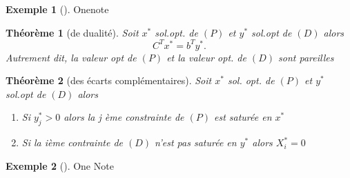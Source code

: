 \documentclass{article}
\theoremstyle{plain}%
\newtheorem{thm}{Théorème}[section]
\theoremstyle{definition}
\newtheorem{exmp}{Exemple}[section]
\theoremstyle{remark}
\begin{document}
\begin{exmp}[]
    Onenote
\end{exmp}

\begin{thm}[de dualité]
    Soit $ x^* $ sol.opt. de $ (P) $ et $ y^* $ sol.opt de $ (D) $ alors 
    \[
        C^T x^* = b^T y^*
    .\]
    Autrement dit, la valeur opt de $ (P) $ et la valeur opt. de $ (D) $ sont pareilles
\end{thm}

\begin{thm}[des écarts complémentaires]
    Soit $ x^* $ sol. opt. de $ (P) $ et $ y^* $ sol.opt de $ (D) $ alors \begin{enumerate}
        \item Si $ y_j^* >0 $ alors la j ème constrainte de $ (P) $ est saturée en $ x^* $ 
        \item Si la ième contrainte de $ (D) $ n'est pas saturée en $ y^* $ alors $ X_i^* = 0 $ 
    \end{enumerate}
\end{thm}

\begin{exmp}[]
    One Note
\end{exmp}
\end{document}
